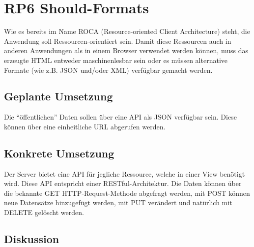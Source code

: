 \section{RP6 Should-Formats}
\label{sec:principle-rp6-should-formats}
Wie es bereits im Name ROCA (Resource-oriented Client Architecture) steht, die Anwendung soll Ressourcen-orientiert sein. Damit diese Ressourcen auch in anderen Anwendungen als in einem Browser verwendet werden können, muss das erzeugte HTML entweder maschinenlesbar sein oder es müssen alternative Formate (wie z.B. JSON und/oder XML) verfügbar gemacht werden.

\subsection*{Geplante Umsetzung}
Die ``öffentlichen'' Daten sollen über eine API als JSON verfügbar sein. Diese können über eine einheitliche URL abgerufen werden.


\subsection*{Konkrete Umsetzung}
Der Server bietet eine API für jegliche Ressource, welche in einer View benötigt wird. Diese API entspricht einer RESTful-Architektur. Die Daten können über die bekannte GET HTTP-Request-Methode abgefragt werden, mit POST können neue Datensätze hinzugefügt werden, mit PUT verändert und natürlich mit DELETE gelöscht werden.



\subsection*{Diskussion}
